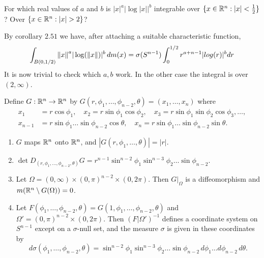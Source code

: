\documentclass[12pt,a4paper]{article}
\begin{document}
\begin{problem}\label{prob:2-64}
For which real values of $a$ and $b$ is $|x|^a |\log |x||^b$ integrable over $\{x \in \mathbb{R}^n : |x| < \frac{1}{2}\}$? Over $\{x \in \mathbb{R}^n : |x| > 2\}$?
\end{problem}
\begin{solution}
    By corollary $2.51$ we have, after attaching a suitable characteristic function, 
	\[
		\int_{B(0,1/2)}\norm{x}^a|\log(\norm{x})|^b\,dm(x)=\sigma(S^{n-1})\int_0^{1/2} r^{a+n-1}|log(r)|^bdr
	\]
	It is now trivial to check which $a,b$ work. 
	In the other case the integral is over $(2,\infty)$.
\end{solution}
\begin{problem}\label{prob:2-65}
Define $G : \mathbb{R}^n \to \mathbb{R}^n$ by $G(r, \phi_1, \dots, \phi_{n-2}, \theta) = (x_1, \dots, x_n)$ where
\[\begin{aligned}
x_1 &= r \cos \phi_1, \quad x_2 = r \sin \phi_1 \cos \phi_2, \quad x_3 = r \sin \phi_1 \sin \phi_2 \cos \phi_3, \dots, \\
x_{n-1} &= r \sin \phi_1 \dots \sin \phi_{n-2} \cos \theta, \quad x_n = r \sin \phi_1 \dots \sin \phi_{n-2} \sin \theta.
\end{aligned}\]
\begin{enumerate}[label=\alph*.]
    \item $G$ maps $\mathbb{R}^n$ onto $\mathbb{R}^n$, and $|G(r, \phi_1, \dots, \theta)| = |r|$.
	\item $\det D_{(r, \phi_1, \dots, \phi_{n-2}, \theta)}G = r^{n-1} \sin^{n-2} \phi_1 \sin^{n-3} \phi_2 \dots \sin \phi_{n-2}$.
    \item Let $\Omega = (0, \infty) \times (0, \pi)^{n-2} \times (0, 2\pi)$. Then $G|_\Omega$ is a diffeomorphism and $m(\mathbb{R}^n \setminus G(\Omega)) = 0$.
    \item Let $F(\phi_1, \dots, \phi_{n-2}, \theta) = G(1, \phi_1, \dots, \phi_{n-2}, \theta)$ and $\Omega' = (0, \pi)^{n-2} \times (0, 2\pi)$. Then $(F|\Omega')^{-1}$ defines a coordinate system on $S^{n-1}$ except on a $\sigma$-null set, and the measure $\sigma$ is given in these coordinates by
    \[ d\sigma(\phi_1, \dots, \phi_{n-2}, \theta) = \sin^{n-2} \phi_1 \sin^{n-3} \phi_2 \dots \sin \phi_{n-2} \, d\phi_1 \dots d\phi_{n-2} \, d\theta. \]
\end{enumerate}
\end{problem}
\end{document}
